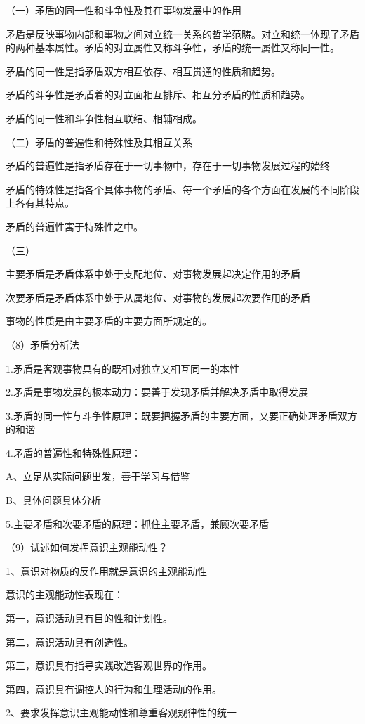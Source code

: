 \documentclass[lang=cn,10pt]{elegantbook}
\begin{document}
	（一）矛盾的同一性和斗争性及其在事物发展中的作用
	
	矛盾是反映事物内部和事物之间对立统一关系的哲学范畴。对立和统一体现了矛盾的两种基本属性。矛盾的对立属性又称斗争性，矛盾的统一属性又称同一性。
	
	矛盾的同一性是指矛盾双方相互依存、相互贯通的性质和趋势。
	
	矛盾的斗争性是矛盾着的对立面相互排斥、相互分矛盾的性质和趋势。
	
	矛盾的同一性和斗争性相互联结、相辅相成。
	
	
	（二）矛盾的普遍性和特殊性及其相互关系
	
	矛盾的普遍性是指矛盾存在于一切事物中，存在于一切事物发展过程的始终
	
	矛盾的特殊性是指各个具体事物的矛盾、每一个矛盾的各个方面在发展的不同阶段上各有其特点。
	
	矛盾的普遍性寓于特殊性之中。
	
	（三）
	
	主要矛盾是矛盾体系中处于支配地位、对事物发展起决定作用的矛盾
	
	次要矛盾是矛盾体系中处于从属地位、对事物的发展起次要作用的矛盾
	
	事物的性质是由主要矛盾的主要方面所规定的。
	
	（8）矛盾分析法
	
	1.矛盾是客观事物具有的既相对独立又相互同一的本性
	
	2.矛盾是事物发展的根本动力：要善于发现矛盾并解决矛盾中取得发展
	
	3.矛盾的同一性与斗争性原理：既要把握矛盾的主要方面，又要正确处理矛盾双方的和谐
	
	4.矛盾的普遍性和特殊性原理：
	
	A、立足从实际问题出发，善于学习与借鉴
	
	B、具体问题具体分析
	
	5.主要矛盾和次要矛盾的原理：抓住主要矛盾，兼顾次要矛盾
	
	（9）试述如何发挥意识主观能动性？
	
	1、意识对物质的反作用就是意识的主观能动性
	
	意识的主观能动性表现在：
	
	第一，意识活动具有目的性和计划性。
	
	第二，意识活动具有创造性。
	
	第三，意识具有指导实践改造客观世界的作用。
	
	第四，意识具有调控人的行为和生理活动的作用。
	
	2、要求发挥意识主观能动性和尊重客观规律性的统一
	
\end{document}
